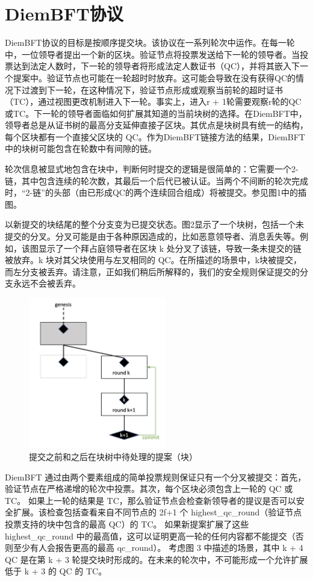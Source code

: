 \section{DiemBFT协议}

DiemBFT协议的目标是按顺序提交块。该协议在一系列轮次中运作。在每一轮中，一位领导者提出一个新的区块。验证节点将投票发送给下一轮的领导者。当投票达到法定人数时，下一轮的领导者将形成法定人数证书（QC），并将其嵌入下一个提案中。验证节点也可能在一轮超时时放弃。这可能会导致在没有获得QC的情况下过渡到下一轮，在这种情况下，验证节点形成或观察当前轮的超时证书（TC），通过视图更改机制进入下一轮。事实上，进入r + 1轮需要观察r轮的QC或TC。下一轮的领导者面临如何扩展其知道的当前块树的选择。在DiemBFT中，领导者总是从证书树的最高分支延伸直接子区块。其优点是块树具有统一的结构，每个区块都有一个直接父区块的 QC。作为DiemBFT链接方法的结果，DiemBFT中的块树可能包含在轮数中有间隙的链。

轮次信息被显式地包含在块中，判断何时提交的逻辑是很简单的：它需要一个2-链，其中包含连续的轮次数，其最后一个后代已被认证。当两个不间断的轮次完成时，“2-链”的头部（由已形成QC的两个连续回合组成）将被提交。参见图1中的插图。

以新提交的块结尾的整个分支变为已提交状态。图2显示了一个块树，包括一个未提交的分叉。分叉可能是由于各种原因造成的，比如恶意领导者、消息丢失等。例如，该图显示了一个拜占庭领导者在区块 k 处分叉了该链，导致一条未提交的链被放弃。k 块对其父块使用与左叉相同的 QC。在所描述的场景中，k块被提交，而左分支被丢弃。请注意，正如我们稍后所解释的，我们的安全规则保证提交的分支永远不会被丢弃。

\begin{figure}[htbp]
    \centering
    \includegraphics[width=6cm]{figures/image2.jpg}
    \caption{提交之前和之后在块树中待处理的提案（块）}
    \label{image2}
\end{figure}

DiemBFT 通过由两个要素组成的简单投票规则保证只有一个分叉被提交：首先，验证节点在严格递增的轮次中投票。其次，每个区块必须包含上一轮的 QC 或 TC。 如果上一轮的结果是 TC，那么验证节点会检查新领导者的提议是否可以安全扩展。该检查包括查看来自不同节点的 2f+1 个 highest\_qc\_round（验证节点投票支持的块中包含的最高 QC）的 TC。 如果新提案扩展了这些 highest\_qc\_round 中的最高值，这可以证明更高一轮的任何内容都不能提交（否则至少有人会报告更高的最高 qc\_round）。 考虑图 3 中描述的场景，其中 k + 4 QC 是在第 k + 3 轮提交块时形成的。在未来的轮次中，不可能形成一个允许扩展低于 k + 3 的 QC 的 TC。


